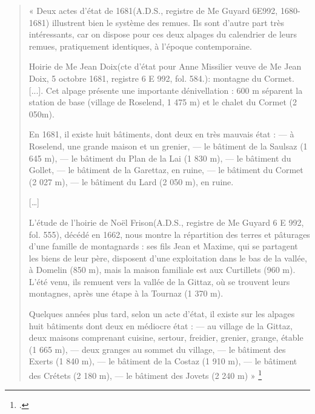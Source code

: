 \documentclass[12pt,a4paper]{report}
\begin{document}
\begin{quote}
	« Deux actes d'état de 1681(A.D.S., registre de Me Guyard 6E992, 1680-1681) illustrent bien le système des remues. Ils sont d'autre part très intéressants, car on dispose pour ces deux alpages du calendrier de leurs remues, pratiquement identiques, à l'époque contemporaine.
	
	Hoirie de Me Jean Doix(cte d'état pour Anne Missilier veuve de Me Jean Doix, 5 octobre 1681, registre 6 E 992, fol. 584.): montagne du Cormet. [...]. Cet alpage présente une importante dénivellation : 600 m séparent la station de base (village de Roselend, 1 475 m) et le chalet du Cormet (2 050m).
	
	En 1681, il existe huit bâtiments, dont deux en très mauvais état :
	— à Roselend, une grande maison et un grenier,
	— le bâtiment de la Saulsaz (1 645 m),
	— le bâtiment du Plan de la Lai (1 830 m),
	— le bâtiment du Gollet,
	— le bâtiment de la Garettaz, en ruine,
	— le bâtiment du Cormet (2 027 m),
	— le bâtiment du Lard (2 050 m), en ruine.
	
	[…]
	
	L'étude de l'hoirie de Noël Frison(A.D.S., registre de Me Guyard 6 E 992, fol. 555), décédé en 1662, nous montre la répartition des terres et pâturages d'une famille de montagnards : ses fils Jean et Maxime, qui se partagent les biens de leur père, disposent d'une exploitation dans le bas de la vallée, à Domelin (850 m), mais la maison familiale est aux Curtillets (960 m). L'été venu, ils remuent vers la vallée de la Gittaz, où se trouvent leurs montagnes, après une étape à la Tournaz (1 370 m).
	
	Quelques années plus tard, selon un acte d'état, il existe sur les alpages huit bâtiments dont deux en médiocre état :
	— au village de la Gittaz, deux maisons comprenant cuisine, sertour, freidier, grenier, grange, étable (1 665 m),
	— deux granges au sommet du village,
	— le bâtiment des Exerts (1 840 m),
	— le bâtiment de la Costaz (1 910 m),
	— le bâtiment des Crétets (2 180 m),
	— le bâtiment des Jovets (2 240 m) »
	\footcite[54--55]{HViallet1993}
\end{quote}



	
	
\end{document}
